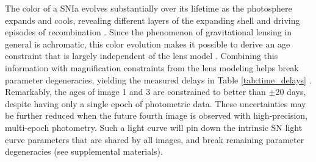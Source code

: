 \documentclass[12pt,dvipsnames]{article}
\def\SNABC{SN Requiem\xspace}
\begin{document}




The color of a SNIa evolves substantially over its lifetime as the photosphere expands and cools, revealing different layers of the expanding shell and driving episodes of recombination \cite{woosley_type_2007,kasen_type_2009}. Since the phenomenon of gravitational lensing in general is achromatic, this color evolution makes it possible to derive an age constraint that is largely independent of the lens model \cite{materials_methods_2020}.  Combining this information with magnification constraints from the lens modeling helps break parameter degeneracies, yielding the measured delays in Table \ref{tab:time_delays} \cite{materials_methods_2020}. 
Remarkably, the ages of image 1 and 3 are constrained to better than $\pm$20 days, despite having only a single epoch of photometric data.    These uncertainties may be 
further reduced when the future fourth image is observed with high-precision, multi-epoch photometry.  Such a light curve will pin down the intrinsic SN light curve parameters that are shared by all images, and break remaining parameter degeneracies (see supplemental materials).
\end{document}
